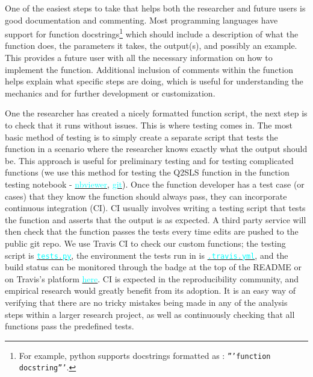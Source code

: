 \documentclass[12pt]{article}
\newcommand{\inlinecode}{\texttt}
\begin{document}
One of the easiest steps to take that helps both the researcher and future users is good documentation and commenting. Most programming languages have support for function docstrings\footnote{For example, python supports docstrings formatted as : \inlinecode{'''function docstring'''}.} which should include a description of what the function does, the parameters it takes, the output(s), and possibly an example. This provides a future user with all the necessary information on how to implement the function. Additional inclusion of comments within the function helps explain what specific steps are doing, which is useful for understanding the mechanics and for further development or customization.

One the researcher has created a nicely formatted function script, the next step is to check that it runs without issues. This is where testing comes in. The most basic method of testing is to simply create a separate script that tests the function in a scenario where the researcher knows exactly what the output should be. This approach is useful for preliminary testing and for testing complicated functions (we use this method for testing the Q2SLS function in the function testing notebook - \href{https://nbviewer.jupyter.org/github/nadavtadelis/Reproducible_Metrics/blob/master/function_testing.ipynb}{\textcolor{cyan}{nbviewer}}, \href{https://github.com/nadavtadelis/Reproducible_Metrics/blob/master/function_testing.ipynb}{\textcolor{cyan}{git}}). Once the function developer has a test case (or cases) that they know the function should always pass, they can incorporate continuous integration (CI). CI usually involves writing a testing script that tests the function and asserts that the output is as expected. A third party service will then check that the function passes the tests every time edits are pushed to the public git repo. We use Travis CI to check our custom functions; the testing script is \href{https://github.com/nadavtadelis/Reproducible_Metrics/blob/master/tests.py}{\textcolor{cyan}{\inlinecode{tests.py}}}, the environment the tests run in is \href{https://github.com/nadavtadelis/Reproducible_Metrics/blob/master/.travis.yml}{\textcolor{cyan}{\inlinecode{.travis.yml}}}, and the build status can be monitored through the badge at the top of the README or on Travis's platform \href{https://travis-ci.org/nadavtadelis/Reproducible_Metrics}{\textcolor{cyan}{here}}. CI is expected in the reproducibility community, and empirical research would greatly benefit from its adoption. It is an easy way of verifying that there are no tricky mistakes being made in any of the analysis steps within a larger research project, as well as continuously checking that all functions pass the predefined tests.
\end{document}
